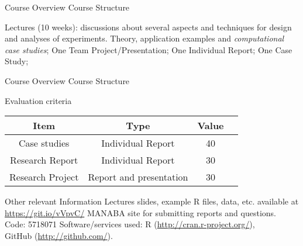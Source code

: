 \documentclass[t]{beamer}
\begin{document}

\begin{ftst}
{Course Overview}
{Course Structure}

\bitems Lectures (10 weeks): discussions about several aspects and
techniques for design and analyses of experiments. Theory, application
examples and \textit{computational case studies};
\spitem One Team Project/Presentation;
\spitem One Individual Report;
\spitem One Case Study;
\eitem
\end{ftst}


\begin{ftst}
{Course Overview}
{Course Structure}
\begin{block}{Evaluation criteria}
	\begin{center}
		\small
		\begin{tabular}{cccc} \hline
			\textbf{Item}	& \textbf{Type}	&Value\\
			\hline
			Case studies		& Individual Report &40\\
			Research Report		& Individual Report &30\\
			Research Project	& Report and presentation &30\\
			\hline
		\end{tabular}
	\end{center}
\end{block}

\begin{block}{Other relevant Information}
	\bitems Lectures slides, example R files, data, etc. available at \\
	{\small \url{https://git.io/vVpvC/}}
	\spitem MANABA site for submitting reports and questions.\\ 
        Code: 5718071
	\spitem Software/services used: R ({\scriptsize\url{http://cran.r-project.org/}}),\\GitHub ({\scriptsize\url{http://github.com/}}).
	\eitem
\end{block}
\end{ftst}

\end{document}
